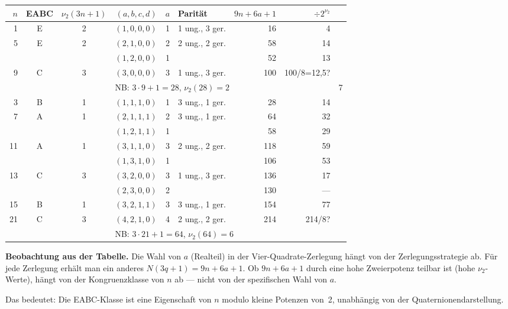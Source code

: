 \documentclass[12pt,a4paper]{article}
\newcommand{\vii}{\nu_2}
\begin{document}
\begin{center}
\renewcommand{\arraystretch}{1.4}
\begin{tabular}{rccrrp{3.5cm}rr}
\toprule
$n$ & EABC & $\vii(3n{+}1)$ & $(a,b,c,d)$ & $a$ & Parität & $9n{+}6a{+}1$ & $\div 2^{\vii}$ \\
\midrule
 1 & E & 2 & $(1,0,0,0)$    &  1 & 1 ung., 3 ger. & 16  & 4 \\
 5 & E & 2 & $(2,1,0,0)$    &  2 & 2 ung., 2 ger. & 58  & 14 \\
   &   &   & $(1,2,0,0)$    &  1 & & 52  & 13 \\
 9 & C & 3 & $(3,0,0,0)$    &  3 & 1 ung., 3 ger. & 100 & 100/8=12,5? \\
   &   &   & \multicolumn{5}{l}{NB: $3\cdot 9+1=28$, $\nu_2(28)=2$} & 7 \\
 3 & B & 1 & $(1,1,1,0)$    &  1 & 3 ung., 1 ger. & 28  & 14 \\
 7 & A & 1 & $(2,1,1,1)$    &  2 & 3 ung., 1 ger. & 64  & 32 \\
   &   &   & $(1,2,1,1)$    &  1 & & 58  & 29 \\
11 & A & 1 & $(3,1,1,0)$    &  3 & 2 ung., 2 ger. & 118 & 59 \\
   &   &   & $(1,3,1,0)$    &  1 & & 106 & 53 \\
13 & C & 3 & $(3,2,0,0)$    &  3 & 1 ung., 3 ger. & 136 & 17 \\
   &   &   & $(2,3,0,0)$    &  2 & & 130 & --- \\
15 & B & 1 & $(3,2,1,1)$    &  3 & 3 ung., 1 ger. & 154 & 77 \\
21 & C & 3 & $(4,2,1,0)$    &  4 & 2 ung., 2 ger. & 214 & 214/8? \\
   &   &   & \multicolumn{5}{l}{NB: $3\cdot 21+1=64$, $\nu_2(64)=6$} & \\
\bottomrule
\end{tabular}
\end{center}

\begin{tcolorbox}[warnung]
\textbf{Beobachtung aus der Tabelle.}
Die Wahl von $a$ (Realteil) in der Vier-Quadrate-Zerlegung hängt von der
Zerlegungsstrategie ab. Für jede Zerlegung erhält man ein anderes $N(3q+1) = 9n+6a+1$.
Ob $9n+6a+1$ durch eine hohe Zweierpotenz teilbar ist (hohe $\vii$-Werte), hängt
von der Kongruenzklasse von $n$ ab --- nicht von der spezifischen Wahl von $a$.

Das bedeutet: Die EABC-Klasse ist eine Eigenschaft von $n$ modulo kleine Potenzen
von~2, unabhängig von der Quaternionendarstellung.
\end{tcolorbox}
\end{document}

